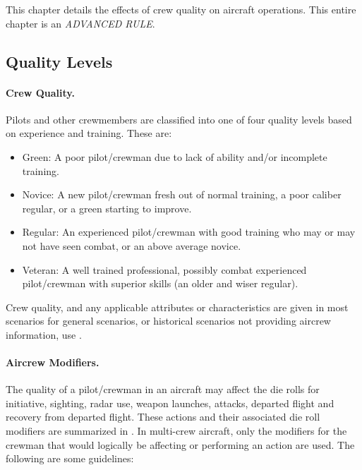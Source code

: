\label{rule:crew-ability}

This chapter details the effects of crew quality on aircraft operations. This entire chapter is an \emph{ADVANCED RULE}.

\begin{advancedrules}

\section{Quality Levels}
\paragraph{Crew Quality.} Pilots and other crewmembers are classified into one of four quality levels based on experience and training. These are:

\begin{itemize}
    \item Green: A poor pilot/crewman due to lack of ability and/or incomplete training.
    \item Novice: A new pilot/crewman fresh out of normal training, a poor caliber regular, or a green starting to improve.
    \item Regular: An experienced pilot/crewman with good training who may or may not have seen combat, or an above average novice.
    \item Veteran: A well trained professional, possibly combat experienced pilot/crewman with superior skills (an older and wiser regular).
\end{itemize}


Crew quality, and any applicable attributes or characteristics are given in most scenarios for general scenarios, or historical scenarios not providing aircrew information, use .


\paragraph{Aircrew Modifiers.} The quality of a pilot/crewman in an aircraft may affect the die rolls for initiative, sighting, radar use, weapon launches, attacks, departed flight and recovery from departed flight. These actions and their associated die roll modifiers are summarized in . In multi-crew aircraft, only the modifiers for the crewman that would logically be affecting or performing an action are used. The following are some guidelines:


\end{advancedrules}
